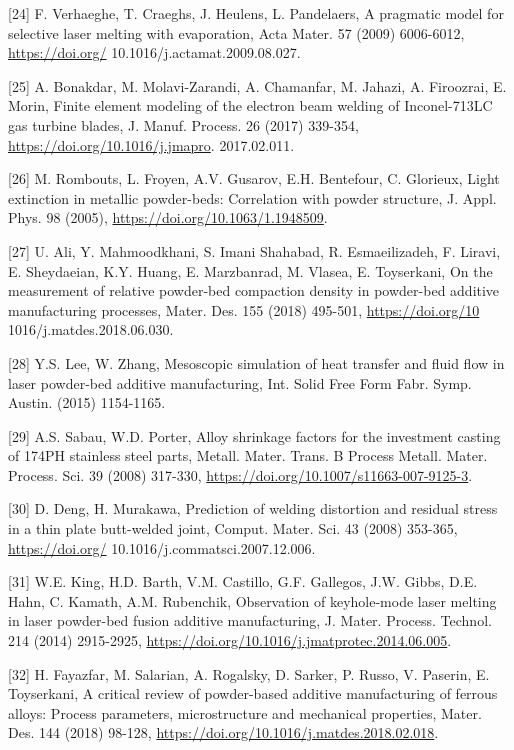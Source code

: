 \documentclass[10pt]{article}
\begin{document}
[24] F. Verhaeghe, T. Craeghs, J. Heulens, L. Pandelaers, A pragmatic model for selective laser melting with evaporation, Acta Mater. 57 (2009) 6006-6012, \href{https://doi.org/}{https://doi.org/} 10.1016/j.actamat.2009.08.027.

[25] A. Bonakdar, M. Molavi-Zarandi, A. Chamanfar, M. Jahazi, A. Firoozrai, E. Morin, Finite element modeling of the electron beam welding of Inconel-713LC gas turbine blades, J. Manuf. Process. 26 (2017) 339-354, \href{https://doi.org/10.1016/j.jmapro}{https://doi.org/10.1016/j.jmapro}. 2017.02.011.

[26] M. Rombouts, L. Froyen, A.V. Gusarov, E.H. Bentefour, C. Glorieux, Light extinction in metallic powder-beds: Correlation with powder structure, J. Appl. Phys. 98 (2005), \href{https://doi.org/10.1063/1.1948509}{https://doi.org/10.1063/1.1948509}.

[27] U. Ali, Y. Mahmoodkhani, S. Imani Shahabad, R. Esmaeilizadeh, F. Liravi, E. Sheydaeian, K.Y. Huang, E. Marzbanrad, M. Vlasea, E. Toyserkani, On the measurement of relative powder-bed compaction density in powder-bed additive manufacturing processes, Mater. Des. 155 (2018) 495-501, \href{https://doi.org/10}{https://doi.org/10} 1016/j.matdes.2018.06.030.

[28] Y.S. Lee, W. Zhang, Mesoscopic simulation of heat transfer and fluid flow in laser powder-bed additive manufacturing, Int. Solid Free Form Fabr. Symp. Austin. (2015) 1154-1165.

[29] A.S. Sabau, W.D. Porter, Alloy shrinkage factors for the investment casting of 174PH stainless steel parts, Metall. Mater. Trans. B Process Metall. Mater. Process. Sci. 39 (2008) 317-330, \href{https://doi.org/10.1007/s11663-007-9125-3}{https://doi.org/10.1007/s11663-007-9125-3}.

[30] D. Deng, H. Murakawa, Prediction of welding distortion and residual stress in a thin plate butt-welded joint, Comput. Mater. Sci. 43 (2008) 353-365, \href{https://doi.org/}{https://doi.org/} 10.1016/j.commatsci.2007.12.006.

[31] W.E. King, H.D. Barth, V.M. Castillo, G.F. Gallegos, J.W. Gibbs, D.E. Hahn, C. Kamath, A.M. Rubenchik, Observation of keyhole-mode laser melting in laser powder-bed fusion additive manufacturing, J. Mater. Process. Technol. 214 (2014) 2915-2925, \href{https://doi.org/10.1016/j.jmatprotec.2014.06.005}{https://doi.org/10.1016/j.jmatprotec.2014.06.005}.

[32] H. Fayazfar, M. Salarian, A. Rogalsky, D. Sarker, P. Russo, V. Paserin, E. Toyserkani, A critical review of powder-based additive manufacturing of ferrous alloys: Process parameters, microstructure and mechanical properties, Mater. Des. 144 (2018) 98-128, \href{https://doi.org/10.1016/j.matdes.2018.02.018}{https://doi.org/10.1016/j.matdes.2018.02.018}.
\end{document}
